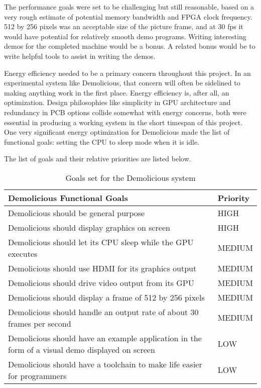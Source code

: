 \documentclass[../main/report.tex]{subfiles}
\begin{document}
The performance goals were set to be challenging but still reasonable, based on a very rough estimate of potential memory bandwidth and FPGA clock frequency.
512 by 256 pixels was an acceptable size of the picture frame, and at 30 fps it would have potential for relatively smooth demo programs.
Writing interesting demos for the completed machine would be a bonus.
A related bonus would be to write helpful tools to assist in writing the demos.

Energy efficiency needed to be a primary concern throughout this project.
In an experimental system like Demolicious, that concern will often be sidelined to making anything work in the first place.
Energy efficiency is, after all, an optimization.
Design philosophies like simplicity in GPU architecture and redundancy in PCB options collide somewhat with energy concerns, both were essential in producing a working system in the short timespan of this project.
One very significant energy optimization for Demolicious made the list of functional goals: setting the CPU to sleep mode when it is idle.

The list of goals and their relative priorities are listed below.

\begin{table}[htp]
    \centering
    \begin{tabular}{|p{8cm}|l|}
        \hline
        \textbf{Demolicious Functional Goals}                & \textbf{Priority} \\ \hline
        Demolicious should be general purpose                                   & HIGH    \\ \hline
        Demolicious should display graphics on screen                           & HIGH    \\ \hline
        Demolicious should let its CPU sleep while the GPU executes				& MEDIUM  \\ \hline
        Demolicious should use HDMI for its graphics output	                    & MEDIUM  \\ \hline
        Demolicious should drive video output from its GPU	                    & MEDIUM  \\ \hline
        Demolicious should display a frame of 512 by 256 pixels					& MEDIUM  \\ \hline
        Demolicious should handle an output rate of about 30 frames per second  & MEDIUM  \\ \hline
        Demolicious should have an example application in the form of a visual demo displayed on screen & LOW \\ \hline
        Demolicious should have a toolchain to make life easier for programmers & LOW     \\ \hline
    \end{tabular}
    \caption{Goals set for the Demolicious system}
    \label{tab:goals}
\end{table}
\end{document}
